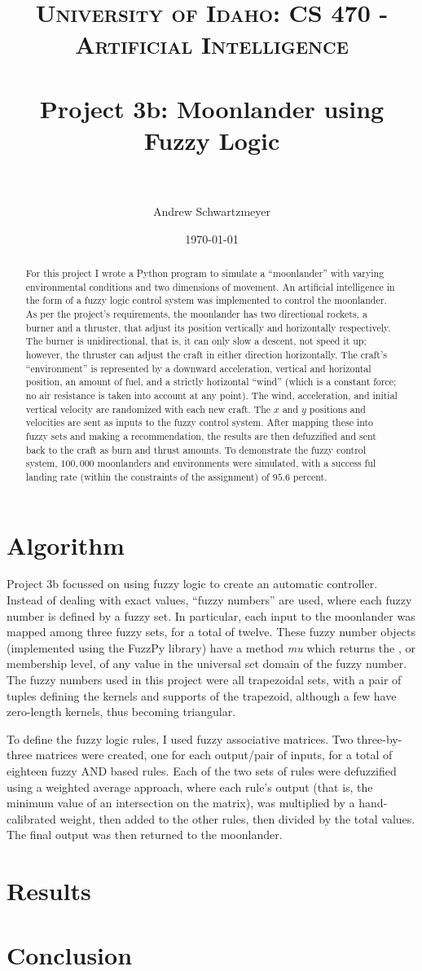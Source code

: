 \documentclass[12pt, article]{scrartcl}
\title{	
\normalfont \normalsize 
\textsc{University of Idaho: CS 470 - Artificial Intelligence} \\ [25pt]
\horrule{0.5pt} \\[0.4cm]
\huge Project 3b: Moonlander using Fuzzy Logic\\
\horrule{2pt} \\[0.5cm]
}
\author{Andrew Schwartzmeyer}
\date{\normalsize\today}
\begin{document}
\maketitle 
\begin{abstract}
For this project I wrote a Python program to simulate a ``moonlander'' with varying environmental conditions and two dimensions of movement. An artificial intelligence in the form of a fuzzy logic control system was implemented to control the moonlander. As per the project's requirements, the moonlander has two directional rockets, a burner and a thruster, that adjust its position vertically and horizontally respectively. The burner is unidirectional, that is, it can only slow a descent, not speed it up; however, the thruster can adjust the craft in either direction horizontally. The craft's ``environment'' is represented by a downward acceleration, vertical and horizontal position, an amount of fuel, and a strictly horizontal ``wind'' (which is a constant force; no air resistance is taken into account at any point). The wind, acceleration, and initial vertical velocity are randomized with each new craft. The $x$ and $y$ positions and velocities are sent as inputs to the fuzzy control system. After mapping these into fuzzy sets and making a recommendation, the results are then defuzzified and sent back to the craft as burn and thrust amounts. To demonstrate the fuzzy control system, $100,000$ moonlanders and environments were simulated, with a success ful landing rate (within the constraints of the assignment) of $95.6$ percent.
\end{abstract}
\pagebreak
\section{Algorithm}
Project 3b focussed on using fuzzy logic to create an automatic controller. Instead of dealing with exact values, ``fuzzy numbers'' are used, where each fuzzy number is defined by a fuzzy set. In particular, each input to the moonlander was mapped among three fuzzy sets, for a total of twelve. These fuzzy number objects (implemented using the FuzzPy library) have a method \emph{mu} which returns the \mu, or membership level, of any value in the universal set domain of the fuzzy number. The fuzzy numbers used in this project were all trapezoidal sets, with a pair of tuples defining the kernels and supports of the trapezoid, although a few have zero-length kernels, thus becoming triangular.

To define the fuzzy logic rules, I used fuzzy associative matrices. Two three-by-three matrices were created, one for each output/pair of inputs, for a total of eighteen fuzzy AND based rules. Each of the two sets of rules were defuzzified using a weighted average approach, where each rule's output (that is, the minimum \mu value of an intersection on the matrix), was multiplied by a hand-calibrated weight, then added to the other rules, then divided by the total \mu values. The final output was then returned to the moonlander.
\section{Results}
\section{Conclusion}
\end{document}
